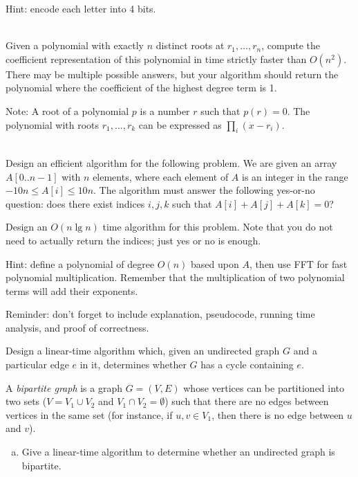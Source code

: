 \documentclass[11pt]{article}
\begin{document}
\begin{qunlist}
\begin{qparts}
Hint: encode each letter into 4 bits.
\end{qparts}

\\
Given a polynomial with exactly $n$ distinct roots at $r_1,\ldots,r_n$, compute the coefficient representation of this polynomial in time strictly faster than $O(n^2)$. There may be multiple possible answers, but your algorithm should return the polynomial where the coefficient of the highest degree term is 1.

Note: A root of a polynomial $p$ is a number $r$ such that $p(r) = 0$. The polynomial with roots $r_1, ..., r_k$ can be expressed as $\displaystyle\prod_{i}(x - r_i)$.


\\
Design an efficient algorithm for the following problem.
We are given an array $A[0..n-1]$ with $n$ elements, where each
element of $A$ is an integer in the range $-10n \le A[i] \le 10n$.
The algorithm must answer the following yes-or-no question:
does there exist indices $i,j,k$ such that
$A[i]+A[j]+A[k]=0$?

Design an $O(n \lg n)$ time algorithm for this problem. Note that you
do not need to actually return the indices; just yes or no is enough.

Hint: define a polynomial of degree $O(n)$ based upon $A$, then use FFT for
fast polynomial multiplication. Remember that the multiplication of two polynomial terms will add their exponents.

Reminder: don't forget to include explanation, pseudocode, running time
analysis, and proof of correctness.



Design a linear-time algorithm which, given an undirected graph $G$ and a particular 
edge $e$ in it, determines whether $G$ has a cycle containing $e$.



A \emph{bipartite graph} is a graph $G = (V, E)$ whose vertices can be partitioned into two sets ($V = V_1 \cup V_2$ and $V_1 \cap V_2 = \emptyset$) such that there are no edges between vertices in the same set (for instance, if $u, v \in V_1$, then there is no edge between $u$ and $v$).

\begin{enumerate}[(a)]
\item
Give a linear-time algorithm to determine whether an undirected graph is bipartite.


\end{enumerate}
\end{qunlist}
\end{document}
